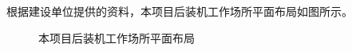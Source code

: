 根据建设单位提供的资料，本项目后装机工作场所平面布局如图所示。

\begin{figure}[H]
\centering
{}
\caption{本项目后装机工作场所平面布局}
\label{fig:ch2-5-f2-c568cd97}
\end{figure}
